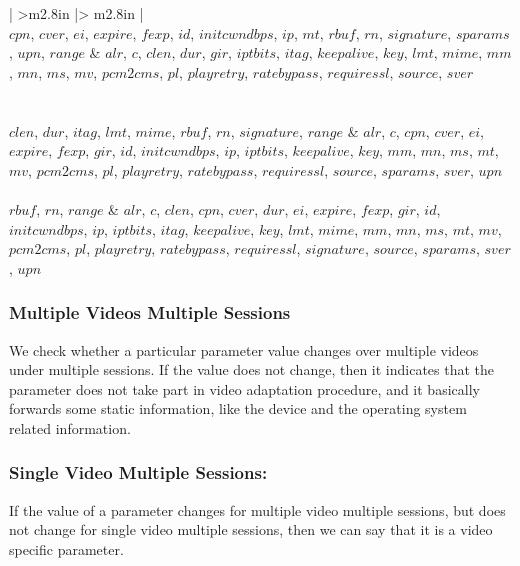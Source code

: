 \begin{table}[!t]
\begin{tabular}{ | >{\centering\arraybackslash}m{2.8in} |> {\centering\arraybackslash}m{2.8in} | }
		  \\ \hline
		$cpn$, $cver$, $ei$, $expire$, $fexp$, $id$, $initcwndbps$, $ip$, $mt$, $rbuf$, $rn$, $signature$, $sparams$, $upn$, $range$ &  $alr$, $c$, $clen$, $dur$, $gir$, $iptbits$, $itag$, $keepalive$, $key$, $lmt$, $mime$, $mm$, $mn$, $ms$, $mv$, $pcm2cms$, $pl$, $playretry$, $ratebypass$, $requiressl$, $source$, $sver$ \\ \hline
		    \\ \hline
		  \\ \hline
		$clen$, $dur$, $itag$, $lmt$, $mime$, $rbuf$, $rn$, $signature$, $range$ & $alr$, $c$, $cpn$, $cver$, $ei$, $expire$, $fexp$, $gir$, $id$, $initcwndbps$, $ip$, $iptbits$, $keepalive$, $key$, $mm$, $mn$, $ms$, $mt$, $mv$, $pcm2cms$, $pl$, $playretry$, $ratebypass$, $requiressl$, $source$, $sparams$, $sver$, $upn$ \\ \hline
		  \\ \hline
		$rbuf$, $rn$, $range$ & $alr$, $c$, $clen$, $cpn$, $cver$, $dur$, $ei$, $expire$, $fexp$, $gir$, $id$, $initcwndbps$, $ip$, $iptbits$, $itag$, $keepalive$, $key$, $lmt$, $mime$, $mm$, $mn$, $ms$, $mt$, $mv$, $pcm2cms$, $pl$, $playretry$, $ratebypass$, $requiressl$, $signature$, $source$, $sparams$, $sver$, $upn$ \\ \hline
	\end{tabular}
\end{table}

\subsubsection{Multiple Videos Multiple Sessions} We check whether a particular parameter value changes over multiple videos under multiple sessions. If the value does not change, then it indicates that the parameter does not take part in video adaptation procedure, and it basically forwards some static information, like the device and the operating system related information.

\subsubsection{Single Video Multiple Sessions:} If the value of a parameter changes for multiple video multiple sessions, but does not change for single video multiple sessions, then we can say that it is a video specific parameter.

